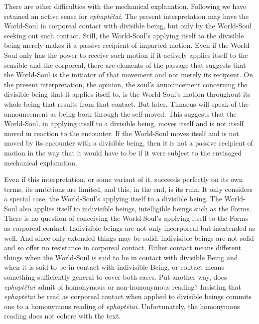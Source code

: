 There are other difficulties with the mechanical explanation. Following \citet{Betegh:2019fq} we have retained an active sense for \emph{ephaptētai}. The present interpretation may have the World-Soul in corporeal contact with divisible being, but only by the World-Soul seeking out such contact. Still, the World-Soul's applying itself to the divisible being merely makes it a passive recipient of imparted motion. Even if the World-Soul only has the power to receive such motion if it actively applies itself to the sensible and the corporeal, there are elements of the passage that suggests that the World-Soul is the initiator of that movement and not merely its recipient. On the present interpretation, the opinion, the soul's announcement concerning the divisible being that it applies itself to, is the World-Soul's motion throughout its whole being that results from that contact. But later, Timaeus will speak of the announcement as being born through the self-moved. This suggests that the World-Soul, in applying itself to a divisible being, moves itself and is not itself moved in reaction to the encounter. If the World-Soul moves itself and is not moved by its encounter with a divisible being, then it is not a passive recipient of motion in the way that it would have to be if it were subject to the envisaged mechanical explanation. 

Even if this interpretation, or some variant of it, succeeds perfectly on its own terms, its ambitions are limited, and this, in the end, is its ruin. It only considers a special case, the World-Soul's applying itself to a divisible being. The World-Soul also applies itself to indivisible beings, intelligible beings such as the Forms. There is no question of conceiving the World-Soul's applying itself to the Forms as corporeal contact. Indivisible beings are not only incorporeal but inextended as well. And since only extended things may be solid, indivisible beings are not solid and so offer no resistance in corporeal contact. Either contact means different things when the World-Soul is said to be in contact with divisible Being and when it is said to be in contact with indivisible Being, or contact means something sufficiently general to cover both cases. Put another way, does \emph{ephaptētai} admit of homonymous or non-homonymous reading? Insisting that \emph{ephaptētai} be read as corporeal contact when applied to divisible beings commits one to a homonymous reading of \emph{ephaptētai}. Unfortunately, the homonymous reading does not cohere with the text.

